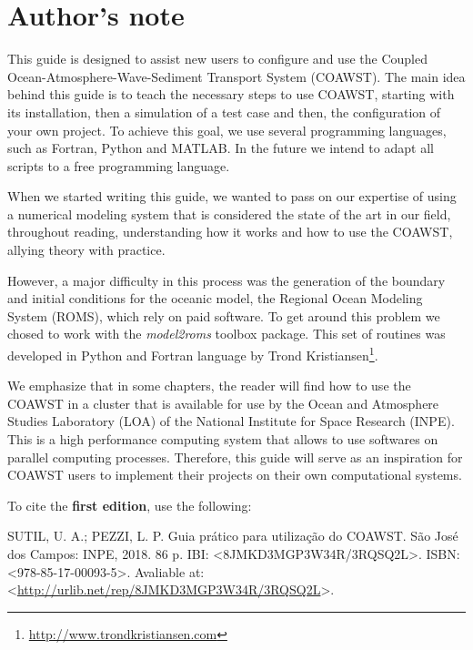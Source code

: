 \chapter*{Author's note}
\bigskip
\noindent This guide is designed to assist new users to configure and use the Coupled Ocean-Atmosphere-Wave-Sediment Transport System (COAWST).
The main idea behind this  guide is to teach the necessary steps to use COAWST, starting with its installation, then a simulation of a test case and 
then, the configuration of your own project. To achieve this goal, we use several programming languages, such as Fortran, Python and MATLAB. In the future we intend to adapt all scripts
to a free programming language.
\bigskip

\noindent When we started writing this guide, we wanted to pass on our expertise of using a numerical modeling system that is considered the state of the art in our field, 
throughout reading, understanding how it works and how to use the COAWST, allying theory with practice.
\bigskip

\noindent However, a major difficulty in this process was the generation of the boundary and initial conditions for the oceanic model, the Regional Ocean Modeling System (ROMS),
which rely on paid software. To get around this problem we chosed to work with the \textit {model2roms} toolbox package. This set of routines was developed in Python and 
Fortran language by Trond Kristiansen\textcolor{bleu_cite}{\textit{}\footnote{\textcolor{bleu_cite}{\href{http://www.trondkristiansen.com}{http://www.trondkristiansen.com}}}}. 
\bigskip

\noindent We emphasize that in some chapters, the reader will find how to use the COAWST in a cluster that is available for use by the Ocean and Atmosphere 
Studies Laboratory (LOA) of the National Institute for Space Research (INPE). This is a high performance computing system that allows to use softwares on 
parallel computing processes. Therefore, this guide will serve as an inspiration for COAWST users to implement their projects on their own computational systems.
\bigskip

\noindent To cite the \textbf{first edition}, use the following:
\bigskip

\noindent SUTIL, U. A.; PEZZI, L. P. Guia prático para utilização do COAWST. São José dos Campos: INPE, 2018. 86 p. IBI: <8JMKD3MGP3W34R/3RQSQ2L>. ISBN: <978-85-17-00093-5>. Avaliable at: <\textcolor{bleu_cite}{\href{http://urlib.net/rep/8JMKD3MGP3W34R/3RQSQ2L}{http://urlib.net/rep/8JMKD3MGP3W34R/3RQSQ2L}}>. 
\bigskip

